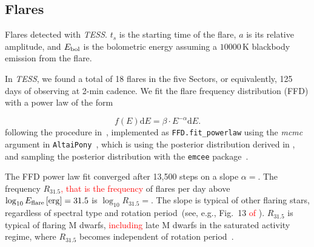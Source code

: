 \documentclass[twocolumn]{aastex631}
\begin{document}
\subsection{Flares}
\label{sec:res:flares}



\begin{table}
\centering
    \caption{Flares detected with \textit{TESS}. $t_s$ is the starting time of the flare, $a$ is its relative amplitude, and $E_{\rm bol}$ is the bolometric energy assuming a $10000\,$K blackbody emission from the flare.}
    
        \label{tab:flares}
\end{table}


In \textit{TESS}, we found a total of 18 flares in the five Sectors, or equivalently, 125 days of observing at 2-min cadence. We fit the flare frequency distribution (FFD) with a power law of the form

\begin{equation}
    f(E) \mathrm{d} E = \beta \cdot E^{-\alpha} \mathrm{d} E.
\end{equation}
following the procedure in~\citet{ilin2021flares}, implemented as \texttt{FFD.fit\_powerlaw} using the \textit{mcmc} argument in \texttt{AltaiPony}~\citep{ilin2021altaipony}, which is using the posterior distribution derived in \citet{wheatland2004bayesian}, and sampling the posterior distribution with the \texttt{emcee} package~\citep{foreman-mackey2013emcee}.

The FFD power law fit converged after 13,500 steps on a slope $\alpha =$\ffdalpha\unskip. The frequency $R_{31.5}$\textcolor{red}{, that is the frequency} of flares per day above $\log_{10} E_{\rm flare}\,[\mathrm{erg}] = 31.5$ is $\log_{10}R_{31.5}=$\ffdr\unskip. The slope is typical of other flaring stars, regardless of spectral type and rotation period~(see, e.g., Fig.~13 \textcolor{red}{of} \citealt{ilin2021flares}). $R_{31.5}$ is typical of flaring M dwarfs, \textcolor{red}{including} late M dwarfs in the saturated activity regime, where $R_{31.5}$ becomes independent of rotation period~\citep{medina2020flare,murray2022study}. 
\end{document}
